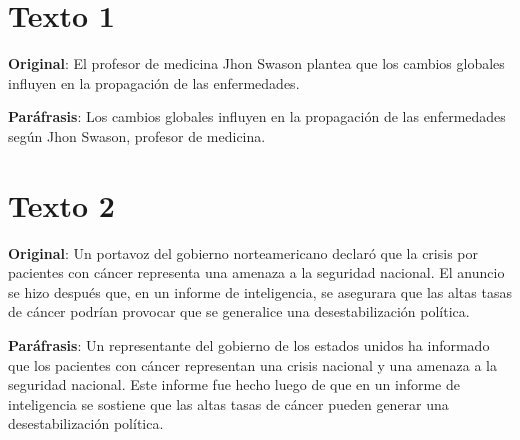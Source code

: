 \documentclass{article}
\begin{document}
\tableofcontents \newpage

\begin{center}
\end{center}  \vspace{2cm}


\section*{Texto 1} \vspace{0.5cm}

\textcolor{trueblue}{\textbf{Original}}:  El profesor de medicina Jhon Swason plantea que los cambios globales influyen en la propagación de las enfermedades.

\textcolor{Apple Green}{\textbf{Paráfrasis}}: Los cambios globales influyen en la propagación de las enfermedades según Jhon Swason, profesor de medicina.

\section*{Texto 2} \vspace{0.5cm}

\textcolor{trueblue}{\textbf{Original}}: Un portavoz del gobierno norteamericano declaró que la crisis por
pacientes con cáncer representa una amenaza a la seguridad nacional. El anuncio
se hizo después que, en un informe de inteligencia, se asegurara que las altas tasas
de cáncer podrían provocar que se generalice una desestabilización política.

\textcolor{Apple Green}{\textbf{Paráfrasis}}: Un representante del gobierno de los estados unidos ha informado que los pacientes con cáncer representan una crisis nacional y una amenaza a la seguridad nacional. Este informe fue hecho luego de que en un informe de inteligencia se sostiene que las altas tasas de cáncer pueden generar una desestabilización política.
\end{document}
